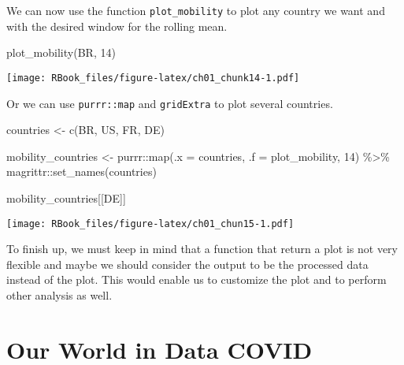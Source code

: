 \documentclass[
]{book}
\newenvironment{Shaded}{\begin{snugshade}}{\end{snugshade}}
\newcommand{\AttributeTok}[1]{\textcolor[rgb]{0.77,0.63,0.00}{#1}}
\newcommand{\DecValTok}[1]{\textcolor[rgb]{0.00,0.00,0.81}{#1}}
\newcommand{\FunctionTok}[1]{\textcolor[rgb]{0.00,0.00,0.00}{#1}}
\newcommand{\NormalTok}[1]{#1}
\newcommand{\OtherTok}[1]{\textcolor[rgb]{0.56,0.35,0.01}{#1}}
\newcommand{\SpecialCharTok}[1]{\textcolor[rgb]{0.00,0.00,0.00}{#1}}
\newcommand{\StringTok}[1]{\textcolor[rgb]{0.31,0.60,0.02}{#1}}
\begin{document}
We can now use the function \texttt{plot\_mobility} to plot any country we want and with the desired window for the rolling mean.

\begin{Shaded}
\begin{Highlighting}[]
\FunctionTok{plot\_mobility}\NormalTok{(}\StringTok{\textquotesingle{}BR\textquotesingle{}}\NormalTok{, }\DecValTok{14}\NormalTok{)}
\end{Highlighting}
\end{Shaded}

\texttt{[image: RBook\_files/figure-latex/ch01\_chunk14-1.pdf]}

Or we can use \texttt{purrr::map} and \texttt{gridExtra} to plot several countries.

\begin{Shaded}
\begin{Highlighting}[]
\NormalTok{countries }\OtherTok{\textless{}{-}} \FunctionTok{c}\NormalTok{(}\StringTok{\textquotesingle{}BR\textquotesingle{}}\NormalTok{, }\StringTok{\textquotesingle{}US\textquotesingle{}}\NormalTok{, }\StringTok{\textquotesingle{}FR\textquotesingle{}}\NormalTok{, }\StringTok{\textquotesingle{}DE\textquotesingle{}}\NormalTok{)}

\NormalTok{mobility\_countries }\OtherTok{\textless{}{-}}\NormalTok{ purrr}\SpecialCharTok{::}\FunctionTok{map}\NormalTok{(}\AttributeTok{.x =}\NormalTok{ countries, }\AttributeTok{.f =}\NormalTok{ plot\_mobility, }\DecValTok{14}\NormalTok{) }\SpecialCharTok{\%\textgreater{}\%} 
\NormalTok{  magrittr}\SpecialCharTok{::}\FunctionTok{set\_names}\NormalTok{(countries)}

\NormalTok{mobility\_countries[[}\StringTok{\textquotesingle{}DE\textquotesingle{}}\NormalTok{]]}
\end{Highlighting}
\end{Shaded}

\texttt{[image: RBook\_files/figure-latex/ch01\_chun15-1.pdf]}

To finish up, we must keep in mind that a function that return a plot is not very flexible and maybe we should consider the output to be the processed data instead of the plot. This would enable us to customize the plot and to perform other analysis as well.

\hypertarget{owidCovid}{%
\chapter{Our World in Data COVID}\label{owidCovid}}
\end{document}
